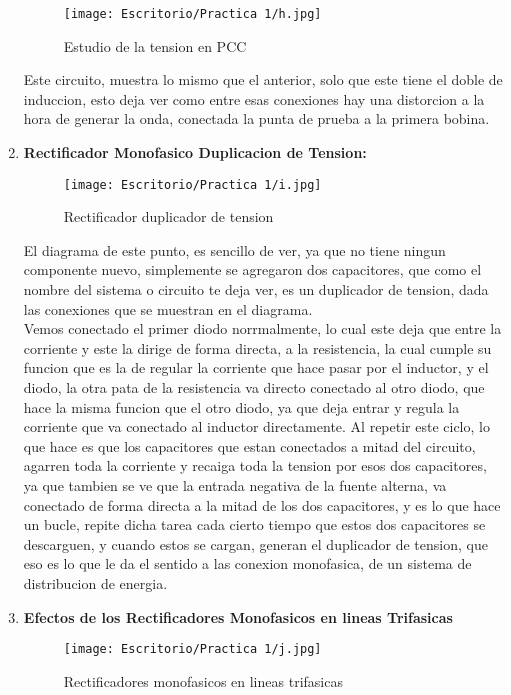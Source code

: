 \documentclass[11pt,a4paper]{article}
\begin{document}
\begin{enumerate}
 
 \begin{figure}[hbtp]
 \centering
 \texttt{[image: Escritorio/Practica 1/h.jpg]}
 \caption{Estudio de la tension en PCC}
 \end{figure}
 
 Este circuito, muestra lo mismo que el anterior, solo que este tiene el doble de induccion, esto deja ver como entre esas conexiones hay una distorcion a la hora de generar la onda, conectada la punta de prueba a la primera bobina.
 
 \item \textbf{Rectificador Monofasico Duplicacion de Tension:}
 \begin{figure}[hbtp]
 \centering
 \texttt{[image: Escritorio/Practica 1/i.jpg]}
 \caption{Rectificador duplicador de tension}
 \end{figure}
 

 El diagrama de este punto, es sencillo de ver, ya que no tiene ningun componente nuevo, simplemente se agregaron dos capacitores, que como el nombre del sistema o circuito te deja ver, es un duplicador de tension, dada las conexiones que se muestran en el diagrama.\\
 Vemos conectado el primer diodo norrmalmente, lo cual este deja que entre la corriente y este la dirige de forma directa, a la resistencia, la cual cumple su funcion que es la de regular la corriente que hace pasar por el inductor, y el diodo, la otra pata de la resistencia va directo conectado al otro diodo, que hace la misma funcion que el otro diodo, ya que deja entrar y regula la corriente que va conectado al inductor directamente. Al repetir este ciclo, lo que hace es que los capacitores que estan conectados a mitad del circuito, agarren toda la corriente y recaiga toda la tension por esos dos capacitores, ya que tambien se ve que la entrada negativa de la fuente alterna, va conectado de forma directa a la mitad de los dos capacitores, y es lo que hace un bucle, repite dicha tarea cada cierto tiempo que estos dos capacitores se descarguen, y cuando estos se cargan, generan el duplicador de tension, que eso es lo que le da el sentido a las conexion monofasica, de un sistema de distribucion de energia.
 
 \item \textbf{Efectos de los Rectificadores Monofasicos en lineas Trifasicas}
\begin{figure}[hbtp]
\centering
\texttt{[image: Escritorio/Practica 1/j.jpg]}
\caption{Rectificadores monofasicos en lineas trifasicas}
\end{figure}


\end{enumerate}
\end{document}
